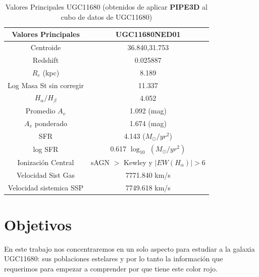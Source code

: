  \begin{table}[!ht]
 \centering
 \begin{tabular}{||c | c||}
 \hline
 \hline
 Valores Principales & UGC11680NED01 \\
 \hline
 \hline
 Centroide & 36.840,31.753 \\
 Redshift & 0.025887\\
 $R_e$ (kpc) & 8.189 \\
 Log Masa St sin corregir  & 11.337\\
 $H_{\alpha}/H_{\beta}$ & 4.052 \\
 Promedio $A_v$ & 1.092  (mag) \\
 $A_v$ ponderado  & 1.674  (mag) \\
 SFR & 4.143 ($M_{\odot}/yr^2$) \\
 log SFR & 0.617 $\log_{10}$ $(M_{\odot}/yr^2)$ \\
 Ionización Central & sAGN  $>$ Kewley y $|EW (H_{\alpha})|>6$\\
 Velocidad Sist Gas & 7771.840 km/s \\
 Velocidad sistemica SSP & 7749.618 km/s \\
 \hline
 \hline
 \end{tabular}
 \caption[Datos de UGC11680] {Valores Principales UGC11680 (obtenidos de aplicar \textbf{PIPE3D} al cubo de datos de UGC11680)}
 \label{tab_valores}                              %
 \end{table}





\section{Objetivos}
En este trabajo nos concentraremos en un solo aspecto para estudiar a la galaxia UGC11680: sus poblaciones estelares  y por lo tanto la información que requerimos para empezar a comprender por que tiene este color rojo.

\bigskip

